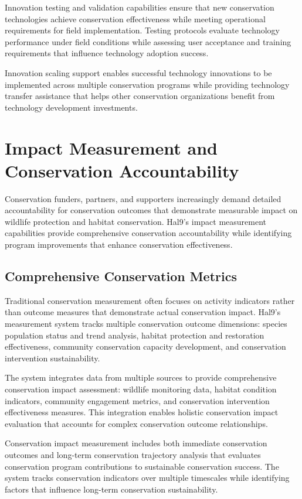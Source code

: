 \documentclass[
  Letterpaper,
]{scrbook}
\begin{document}
Innovation testing and validation capabilities ensure that new
conservation technologies achieve conservation effectiveness while
meeting operational requirements for field implementation. Testing
protocols evaluate technology performance under field conditions while
assessing user acceptance and training requirements that influence
technology adoption success.

Innovation scaling support enables successful technology innovations to
be implemented across multiple conservation programs while providing
technology transfer assistance that helps other conservation
organizations benefit from technology development investments.

\section{Impact Measurement and Conservation
Accountability}\label{impact-measurement-and-conservation-accountability}

Conservation funders, partners, and supporters increasingly demand
detailed accountability for conservation outcomes that demonstrate
measurable impact on wildlife protection and habitat conservation.
Hal9's impact measurement capabilities provide comprehensive
conservation accountability while identifying program improvements that
enhance conservation effectiveness.

\subsection{Comprehensive Conservation
Metrics}\label{comprehensive-conservation-metrics}

Traditional conservation measurement often focuses on activity
indicators rather than outcome measures that demonstrate actual
conservation impact. Hal9's measurement system tracks multiple
conservation outcome dimensions: species population status and trend
analysis, habitat protection and restoration effectiveness, community
conservation capacity development, and conservation intervention
sustainability.

The system integrates data from multiple sources to provide
comprehensive conservation impact assessment: wildlife monitoring data,
habitat condition indicators, community engagement metrics, and
conservation intervention effectiveness measures. This integration
enables holistic conservation impact evaluation that accounts for
complex conservation outcome relationships.

Conservation impact measurement includes both immediate conservation
outcomes and long-term conservation trajectory analysis that evaluates
conservation program contributions to sustainable conservation success.
The system tracks conservation indicators over multiple timescales while
identifying factors that influence long-term conservation
sustainability.
\end{document}
